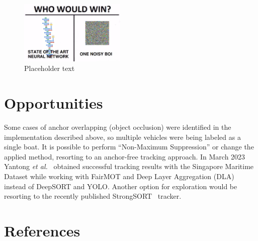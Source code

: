 \documentclass[a4paper,12pt]{article}
\begin{document}
\begin{multicols}{2}
\begin{figure}[H]
    \centering
    \includegraphics[width=0.45\textwidth]{placeholder}
    \caption{Placeholder text}
    \label{fig:3}
\end{figure}

\section{Opportunities}\label{sec:opportunities}
Some cases of anchor overlapping (object occlusion) were identified in the implementation described above, so multiple vehicles were being labeled as a single boat.
It is possible to perform ``Non-Maximum Suppression'' or change the applied method, resorting to an anchor-free tracking approach.
In March 2023 Yantong \textit{et al.}~\cite{FAIRMOT} obtained successful tracking results with the Singapore Maritime Dataset while working with FairMOT and Deep Layer Aggregation (DLA) instead of DeepSORT and YOLO\@.
Another option for exploration would be resorting to the recently published StrongSORT~\cite{STRONGSORT} tracker.

\section{References}\label{sec:references}
\printbibliography[heading=none]
\end{multicols}
\end{document}
